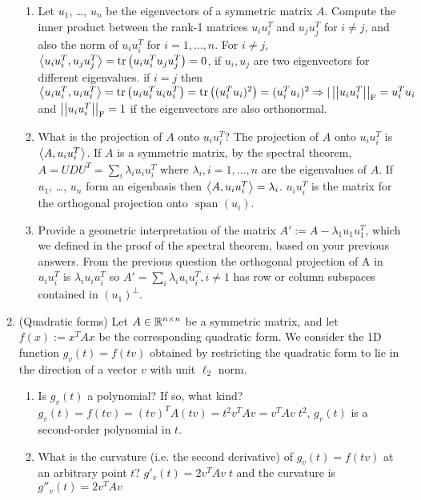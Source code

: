 \documentclass[12pt,twoside]{article}
\begin{document}
\begin{enumerate}
\begin{enumerate}
\item Let $u_1$, \ldots, $u_n$ be the eigenvectors of a symmetric matrix $A$. Compute the inner product between the rank-1 matrices $u_iu_i^T$ and $u_ju_j^T$ for $i \neq j$, and also the norm of $u_iu_i^T$ for $i=1,\ldots,n$. 
For $i \neq j$, $\left \langle u_iu_i^T, u_ju_j^T\right \rangle = \operatorname{tr}\left( u_iu_i^Tu_ju_j^T \right) = 0$, if $u_i, u_j$ are two eigenvectors for different eigenvalues.
if $i=j$ then  $\left \langle u_iu_i^T, u_iu_i^T\right \rangle = \operatorname{tr}\left( u_iu_i^Tu_iu_i^T \right) = \operatorname{tr}\left( (u_i^Tu_i)^2 \right) = (u_i^Tu_i)^2 \Rightarrow |\left|\left| u_i u_i^T \right|\right| _{\operatorname{F}} =  u_i^Tu_i$ and $\left|\left| u_iu_i^T \right|\right| _{\operatorname{F}}=1$ if the eigenvectors are also orthonormal.
\item What is the projection of $A$ onto $u_iu_i^T$?
The projection of $A$ onto $u_iu_i^T$ is $\left \langle A, u_iu_i^T\right \rangle$. If $A$ is a symmetric matrix, by the spectral theorem, $A=U D U^T= \sum_i \lambda_i u_i u_i^T$ where $\lambda_i, i=1, \ldots,n$ are the eigenvalues of $A$. If $u_1$, \ldots, $u_n$ form an eigenbasis then $\left \langle A, u_iu_i^T\right \rangle = \lambda_i$. $u_iu_i^T$ is the matrix for the orthogonal projection
onto $\text{ span }(u_i)$.

\item Provide a geometric interpretation of the matrix $A':=A-\lambda_1 u_1u_1^T$, which we defined in the proof of the spectral theorem, based on your previous answers.
From the previous question the orthogonal projection of A in $u_iu_i^T$ is $\lambda_i u_iu_i^T$ so $A' = \sum_i \lambda_i u_iu_i^T, i \neq 1$ has row or column subspaces contained in  $(u_1)^\bot$.

\end{enumerate}

\item (Quadratic forms) Let $A\in \mathbb{R}^{n \times n}$ be a symmetric matrix, and let $f(x):=x^TAx$ be the corresponding quadratic form. We consider the 1D function $g_{v}(t)=f(tv)$ obtained by restricting the quadratic form to lie in the direction of a vector $v$ with unit $\ell_2$ norm.
\begin{enumerate}
\item Is $g_{v}(t)$ a polynomial? If so, what kind?
	$g_{v}(t) = f(tv) = (tv)^T A (tv) = t^2 v^T A v = v^T A v \; t^2$, $g_{v}(t)$ is a second-order polynomial in $t$. 
\item What is the curvature (i.e. the second derivative) of $g_{v}(t)=f(tv)$ at an arbitrary point $t$?
$g'_{v}(t)= 2 v^T A v \; t$ and the curvature is $g''_{v}(t)= 2 v^T A v$


\end{enumerate}
\end{enumerate}
\end{document}
